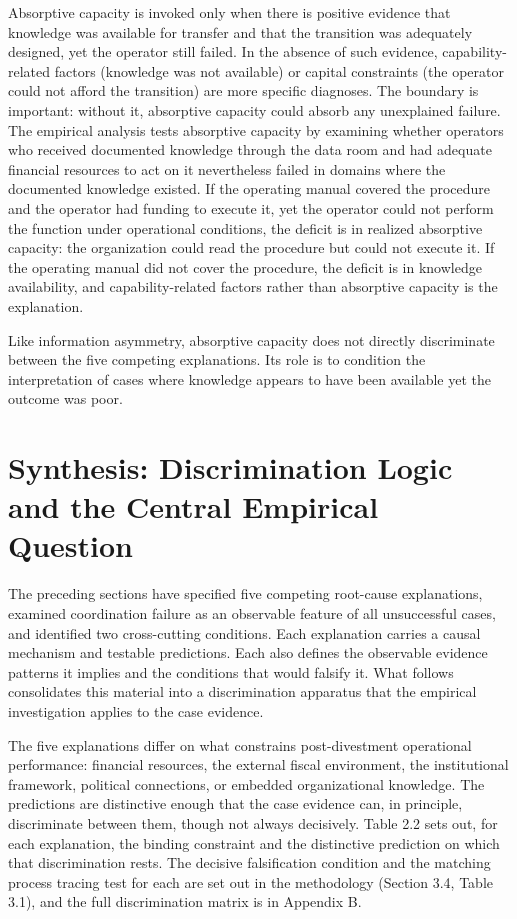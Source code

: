 \documentclass[twoside,fontset=lmodern]{mitthesis}
\begin{document}
Absorptive capacity is invoked only when there is positive evidence that
knowledge was available for transfer and that the transition was
adequately designed, yet the operator still failed. In the absence of
such evidence, capability-related factors (knowledge was not available)
or capital constraints (the operator could not afford the transition)
are more specific diagnoses. The boundary is important: without it,
absorptive capacity could absorb any unexplained failure. The empirical
analysis tests absorptive capacity by examining whether operators who
received documented knowledge through the data room and had adequate
financial resources to act on it nevertheless failed in domains where
the documented knowledge existed. If the operating manual covered the
procedure and the operator had funding to execute it, yet the operator
could not perform the function under operational conditions, the deficit
is in realized absorptive capacity: the organization could read the
procedure but could not execute it. If the operating manual did not
cover the procedure, the deficit is in knowledge availability, and
capability-related factors rather than absorptive capacity is the
explanation.

Like information asymmetry, absorptive capacity does not directly
discriminate between the five competing explanations. Its role is to
condition the interpretation of cases where knowledge appears to have
been available yet the outcome was poor.

\hypertarget{synthesis-discrimination-logic-and-the-central-empirical-question}{%
\section{Synthesis: Discrimination Logic and the Central Empirical
Question}\label{synthesis-discrimination-logic-and-the-central-empirical-question}}

The preceding sections have specified five competing root-cause
explanations, examined coordination failure as an observable feature of
all unsuccessful cases, and identified two cross-cutting conditions.
Each explanation carries a causal mechanism and testable predictions.
Each also defines the observable evidence patterns it implies and the
conditions that would falsify it. What follows consolidates this
material into a discrimination apparatus that the empirical
investigation applies to the case evidence.

The five explanations differ on what constrains post-divestment
operational performance: financial resources, the external fiscal
environment, the institutional framework, political connections, or
embedded organizational knowledge. The predictions are distinctive
enough that the case evidence can, in principle, discriminate between
them, though not always decisively. Table 2.2 sets out, for each
explanation, the binding constraint and the distinctive prediction on
which that discrimination rests. The decisive falsification condition
and the matching process tracing test for each are set out in the
methodology (Section 3.4, Table 3.1), and the full discrimination matrix
is in Appendix B.
\end{document}
